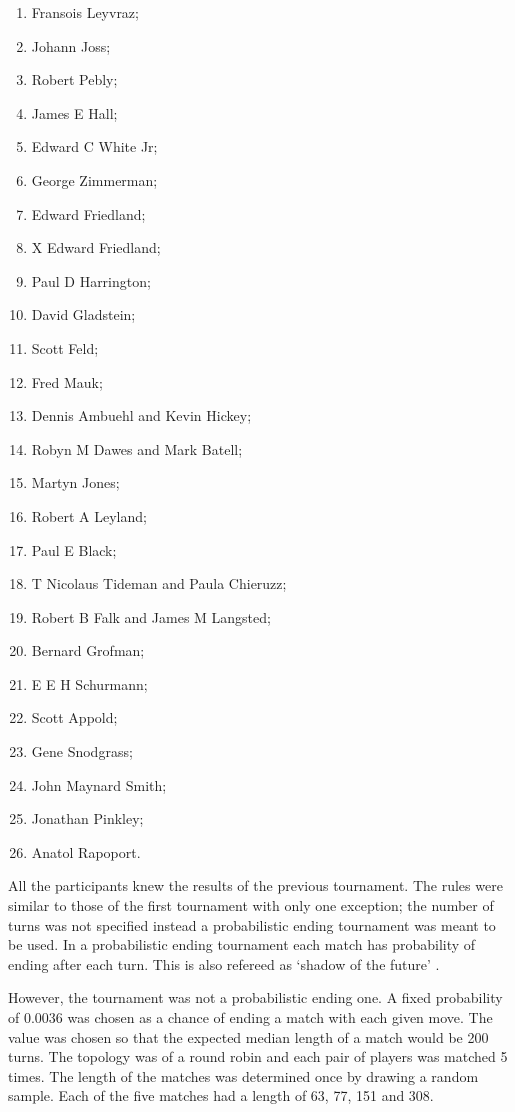 \documentclass{article}
\begin{document}
\begin{multicols}{3}
\begin{enumerate}
        \item Fransois Leyvraz;
        \item Johann Joss;
        \item Robert Pebly;
        \item James E Hall;
        \item Edward C White Jr;
        \item George Zimmerman;
        \item Edward Friedland;
        \item X	Edward Friedland;
        \item Paul D Harrington;
        \item David Gladstein;
        \item Scott Feld;
        \item Fred Mauk;
        \item Dennis Ambuehl and Kevin Hickey;
        \item Robyn M Dawes and Mark Batell;
        \item Martyn Jones;
        \item Robert A Leyland;
        \item Paul E Black;
        \item T Nicolaus Tideman and Paula Chieruzz;
        \item Robert B Falk and James M Langsted;
        \item Bernard Grofman;
        \item E E H Schurmann;
        \item Scott Appold;
        \item Gene Snodgrass;
        \item John Maynard Smith;
        \item Jonathan Pinkley;
        \item Anatol Rapoport.
    \end{enumerate}
\end{multicols}

All the participants knew the results of the previous tournament. The rules 
were similar to those of the first tournament with only one exception;
the number of turns was not specified instead a probabilistic ending tournament was
meant to be used. In a probabilistic ending tournament each match has probability 
of ending after each turn. This is  also refereed as `shadow of the future'
\cite{Axelrod1988}.

However, the tournament was not a probabilistic ending one. A fixed probability 
of  0.0036 was chosen as a chance of ending a match with each given move. The
value was chosen so that the expected median length of a match would be 200
turns. The topology was of a round robin and each pair of players was matched 
5 times. The length of the matches was determined once by drawing a random sample.
Each of the five matches had a length of 63, 77, 151 and 308.
\end{document}
